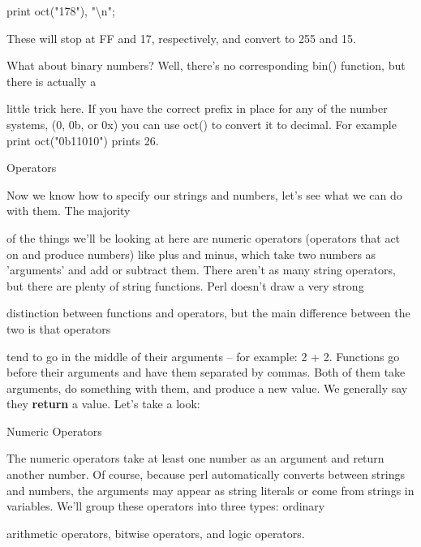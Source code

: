 \documentclass[a4paper,11pt]{book}
\begin{document}
\noindent print oct("178"), "\textbackslash n";

\noindent 

\noindent These will stop at FF and 17, respectively, and convert to 255 and 15.

\noindent 

\noindent 

\noindent What about binary numbers? Well, there's no corresponding bin() function, but there is actually a

\noindent little trick here. If you have the correct prefix in place for any of the number systems, (0, 0b, or 0x) you can use oct() to convert it to decimal. For example print oct("0b11010") prints 26.

\noindent 

\noindent 

\noindent Operators

\noindent 

\noindent Now we know how to specify our strings and numbers, let's see what we can do with them. The majority

\noindent of the things we'll be looking at here are numeric operators (operators that act on and produce numbers) like plus and minus, which take two numbers as 'arguments' and add or subtract them. There aren't as many string operators, but there are plenty of string functions. Perl doesn't draw a very strong

\noindent distinction between functions and operators, but the main difference between the two is that operators

\noindent tend to go in the middle of their arguments -- for example: 2 + 2. Functions go before their arguments and have them separated by commas. Both of them take arguments, do something with them, and produce a new value. We generally say they \textbf{return }a value. Let's take a look:

\noindent 

\noindent Numeric Operators

\noindent 

\noindent The numeric operators take at least one number as an argument and return another number. Of course, because perl automatically converts between strings and numbers, the arguments may appear as string literals or come from strings in variables. We'll group these operators into three types: ordinary

\noindent arithmetic operators, bitwise operators, and logic operators.
\end{document}
